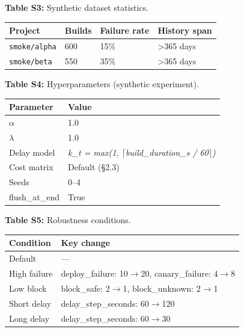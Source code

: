 \documentclass[10pt]{article}
\begin{document}
\noindent\textbf{Table S3:} Synthetic dataset statistics.

\begin{table}[t]\centering\footnotesize\begin{tabular}{llll}
\toprule\noalign{}
Project & Builds & Failure rate & History span \\
\midrule\noalign{}
\bottomrule\noalign{}
\texttt{smoke/alpha} & 600 & 15\% & \textgreater365 days \\
\texttt{smoke/beta} & 550 & 35\% & \textgreater365 days \\
\end{tabular}\end{table}

\noindent\textbf{Table S4:} Hyperparameters (synthetic experiment).

\begin{table}[t]\centering\footnotesize\begin{tabular}{ll}
\toprule\noalign{}
Parameter & Value \\
\midrule\noalign{}
\bottomrule\noalign{}
$\alpha$ & 1.0 \\
$\lambda$ & 1.0 \\
Delay model & \emph{k\_t = max(1, $\lceil$build\_duration\_s / 60$\rceil$)} \\
Cost matrix & Default (§2.3) \\
Seeds & 0--4 \\
flush\_at\_end & True \\
\end{tabular}\end{table}

\noindent\textbf{Table S5:} Robustness conditions.

\begin{table}[t]\centering\footnotesize\begin{tabular}{ll}
\toprule\noalign{}
Condition & Key change \\
\midrule\noalign{}
\bottomrule\noalign{}
Default & --- \\
High failure & deploy\_failure: 10$\rightarrow$20, canary\_failure: 4$\rightarrow$8 \\
Low block & block\_safe: 2$\rightarrow$1, block\_unknown: 2$\rightarrow$1 \\
Short delay & delay\_step\_seconds: 60$\rightarrow$120 \\
Long delay & delay\_step\_seconds: 60$\rightarrow$30 \\
\end{tabular}\end{table}
\end{document}
